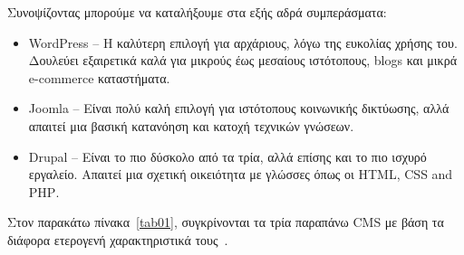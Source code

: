 \documentclass[12pt]{report}
\begin{document}
Συνοψίζοντας μπορούμε να καταλήξουμε στα εξής αδρά συμπεράσματα:
\begin{itemize}
\item \textlatin{WordPress} – Η καλύτερη επιλογή για αρχάριους, λόγω της ευκολίας χρήσης του. Δουλεύει εξαιρετικά καλά για μικρούς έως μεσαίους ιστότοπους, \textlatin{blogs} και μικρά \textlatin{e-commerce} καταστήματα.
\item \textlatin{Joomla} – Είναι πολύ καλή επιλογή για ιστότοπους κοινωνικής δικτύωσης, αλλά απαιτεί μια βασική κατανόηση και κατοχή τεχνικών γνώσεων.
\item \textlatin{Drupal} – Είναι το πιο δύσκολο από τα τρία, αλλά επίσης και το πιο ισχυρό εργαλείο. Απαιτεί μια σχετική οικειότητα με γλώσσες όπως οι \textlatin{HTML, CSS and PHP}.
\end{itemize}

Στον παρακάτω πίνακα~\ref{tab01}, συγκρίνονται τα τρία παραπάνω \textlatin{CMS} με βάση τα διάφορα ετερογενή χαρακτηριστικά τους~\cite{comparison_tables}.
\end{document}
